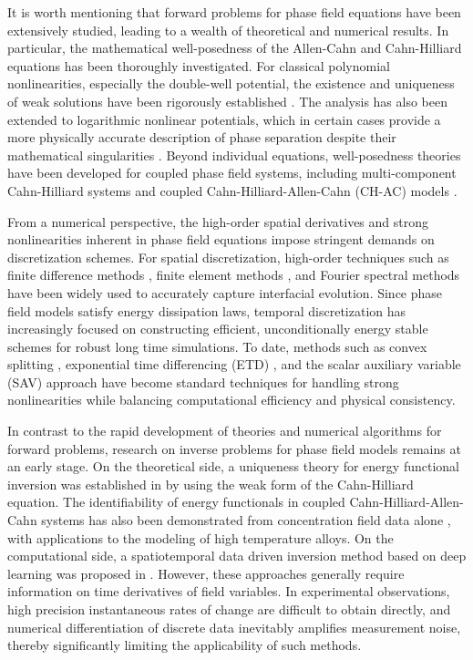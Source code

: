 \documentclass[11pt,reqno]{amsart}
\begin{document}
It is worth mentioning that forward problems for phase field equations have been extensively studied, leading to a wealth of theoretical and numerical results. In particular, the mathematical well-posedness of the Allen-Cahn and Cahn-Hilliard equations has been thoroughly investigated. For classical polynomial nonlinearities, especially the double-well potential, the existence and uniqueness of weak solutions have been rigorously established \cite{elliott1989nonconforming, evans2022partial}. The analysis has also been extended to logarithmic nonlinear potentials, which in certain cases provide a more physically accurate description of phase separation despite their mathematical singularities \cite{cherfils2000generalized, morocsanu2016well}. Beyond individual equations, well-posedness theories have been developed for coupled phase field systems, including multi-component Cahn-Hilliard systems and coupled Cahn-Hilliard-Allen-Cahn (CH-AC) models \cite{barrett2002finite, barrett2001fully, brunk2021analysis, feng2006fully}.

From a numerical perspective, the high-order spatial derivatives and strong nonlinearities inherent in phase field equations impose stringent demands on discretization schemes. For spatial discretization, high-order techniques such as finite difference methods \cite{chen2002phase}, finite element methods \cite{shen2010numerical}, and Fourier spectral methods \cite{chen1998applications} have been widely used to accurately capture interfacial evolution. Since phase field models satisfy energy dissipation laws, temporal discretization has increasingly focused on constructing efficient, unconditionally energy stable schemes for robust long time simulations. To date, methods such as convex splitting \cite{eyre1998unconditionally}, exponential time differencing (ETD) \cite{fu2022energy}, and the scalar auxiliary variable (SAV) approach \cite{shen2018scalar} have become standard techniques for handling strong nonlinearities while balancing computational efficiency and physical consistency.

In contrast to the rapid development of theories and numerical algorithms for forward problems, research on inverse problems for phase field models remains at an early stage. On the theoretical side, a uniqueness theory for energy functional inversion was established in \cite{brunk2023uniqueness} by using the weak form of the Cahn-Hilliard equation. The identifiability of energy functionals in coupled Cahn-Hilliard-Allen-Cahn systems has also been demonstrated from concentration field data alone \cite{ni2024uniqueness}, with applications to the modeling of high temperature alloys. On the computational side, a spatiotemporal data driven inversion method based on deep learning was proposed in \cite{bao2025pfwnn}. However, these approaches generally require information on time derivatives of field variables. In experimental observations, high precision instantaneous rates of change are difficult to obtain directly, and numerical differentiation of discrete data inevitably amplifies measurement noise, thereby significantly limiting the applicability of such methods.
\end{document}
